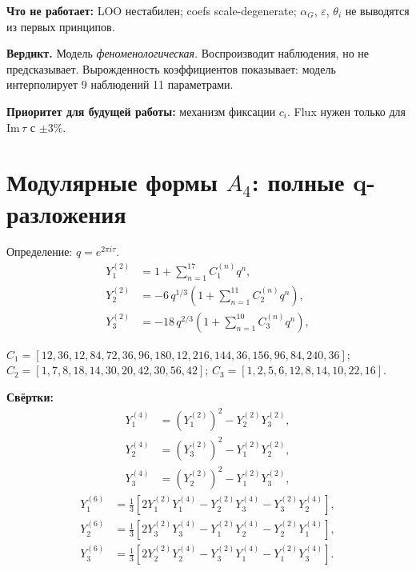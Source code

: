 \documentclass[12pt,a4paper]{article}
\numberwithin{equation}{section}
\begin{document}
\textbf{Что не работает:} LOO нестабилен; coefs scale-degenerate;
$\alpha_G$, $\varepsilon$, $\theta_i$ не выводятся из первых принципов.

\textbf{Вердикт.} Модель \emph{феноменологическая}. Воспроизводит
наблюдения, но не предсказывает. Вырожденность коэффициентов
показывает: модель интерполирует 9 наблюдений 11 параметрами.

\textbf{Приоритет для будущей работы:} механизм фиксации $c_i$.
Flux нужен только для $\mathrm{Im}\,\tau$ с $\pm 3\%$.

\appendix
\newpage

\section{Модулярные формы $A_4$: полные q-разложения}
\label{app:Yforms}

Определение: $q = e^{2\pi i\tau}$.
\begin{align}
Y_1^{(2)} &= 1 + \sum_{n=1}^{17} C_1^{(n)} q^n, \\
Y_2^{(2)} &= -6\, q^{1/3}\left(1 + \sum_{n=1}^{11} C_2^{(n)} q^n\right), \\
Y_3^{(2)} &= -18\, q^{2/3}\left(1 + \sum_{n=1}^{10} C_3^{(n)} q^n\right),
\end{align}

$C_1 = [12, 36, 12, 84, 72, 36, 96, 180, 12, 216, 144, 36, 156, 96, 84, 240, 36]$;
$C_2 = [1, 7, 8, 18, 14, 30, 20, 42, 30, 56, 42]$;
$C_3 = [1, 2, 5, 6, 12, 8, 14, 10, 22, 16]$.

\textbf{Свёртки:}
\begin{align}
Y_1^{(4)} &= (Y_1^{(2)})^2 - Y_2^{(2)} Y_3^{(2)}, \\
Y_2^{(4)} &= (Y_3^{(2)})^2 - Y_1^{(2)} Y_2^{(2)}, \\
Y_3^{(4)} &= (Y_2^{(2)})^2 - Y_1^{(2)} Y_3^{(2)},
\end{align}
\begin{align}
Y_1^{(6)} &= \tfrac13\left[2 Y_1^{(2)} Y_1^{(4)} - Y_2^{(2)} Y_3^{(4)} - Y_3^{(2)} Y_2^{(4)}\right], \\
Y_2^{(6)} &= \tfrac13\left[2 Y_3^{(2)} Y_3^{(4)} - Y_1^{(2)} Y_2^{(4)} - Y_2^{(2)} Y_1^{(4)}\right], \\
Y_3^{(6)} &= \tfrac13\left[2 Y_2^{(2)} Y_2^{(4)} - Y_3^{(2)} Y_1^{(4)} - Y_1^{(2)} Y_3^{(4)}\right].
\end{align}
\end{document}
